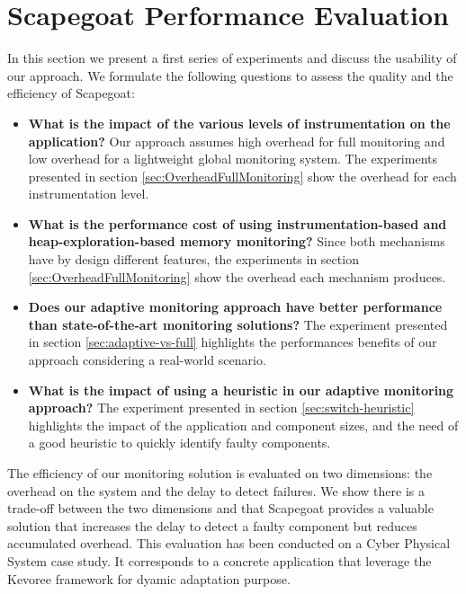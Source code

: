 \section{Scapegoat Performance Evaluation\label{sec:evaluation}}

In this section we present a first series of experiments and discuss the usability of our approach.
We formulate the following questions to assess the quality and the efficiency of Scapegoat:

\begin{itemize}
	\item \textbf{What is the impact of the various levels of instrumentation on the application?}
	Our approach assumes high overhead for full monitoring and low overhead for a lightweight global monitoring system. The experiments presented in section \ref{sec:OverheadFullMonitoring} show the overhead for each instrumentation level.
	\item \textbf{What is the performance cost of using instrumentation-based and heap-exploration-based memory monitoring?}
	Since both mechanisms have by design different features, the experiments in section \ref{sec:OverheadFullMonitoring} show the overhead each mechanism produces. 
	\item \textbf{Does our adaptive monitoring approach have better performance than state-of-the-art monitoring solutions?}
	The experiment presented in section \ref{sec:adaptive-vs-full} highlights the performances benefits of our approach considering a real-world scenario.
	\item \textbf{What is the impact of using a heuristic in our adaptive monitoring approach?}
	The experiment presented in section \ref{sec:switch-heuristic} highlights the impact of the application and component sizes, and the need of a good heuristic to quickly identify faulty components.
\end{itemize}

The efficiency of our monitoring solution is evaluated on two dimensions: the overhead on the system and the delay to detect failures.
We show there is a trade-off between the two dimensions and that Scapegoat provides a valuable solution that increases the delay to detect a faulty component but reduces accumulated overhead.
This evaluation has been conducted on a Cyber Physical System case study.
It corresponds to a concrete application that leverage the Kevoree framework for dyamic adaptation purpose.


